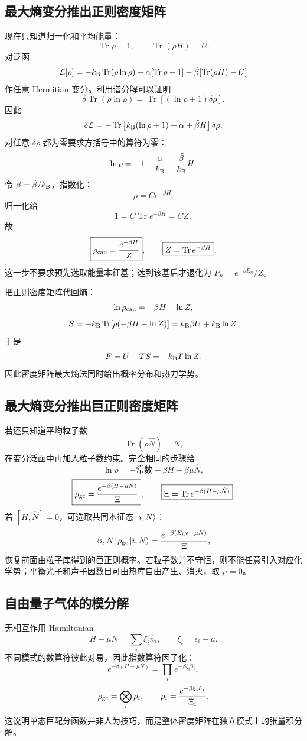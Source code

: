 \subsection{最大熵变分推出正则密度矩阵}
现在只知道归一化和平均能量：
\[
\operatorname{Tr}\rho=1,\qquad
\operatorname{Tr}(\rho H)=U.
\]
对泛函
\[
\mathcal L[\rho]
=-k_{\mathrm B}\operatorname{Tr}(\rho\ln\rho)
-\alpha[\operatorname{Tr}\rho-1]
-\tilde\beta[\operatorname{Tr}(\rho H)-U]
\]
作任意 Hermitian 变分。利用谱分解可以证明
\[
\delta\operatorname{Tr}(\rho\ln\rho)
=\operatorname{Tr}[(\ln\rho+1)\delta\rho].
\]
因此
\[
\delta\mathcal L
=-\operatorname{Tr}\left[
k_{\mathrm B}(\ln\rho+1)+\alpha+\tilde\beta H
\right]\delta\rho.
\]
对任意 $\delta\rho$ 都为零要求方括号中的算符为零：
\[
\ln\rho=-1-\frac{\alpha}{k_{\mathrm B}}
-\frac{\tilde\beta}{k_{\mathrm B}}H.
\]
令 $\beta=\tilde\beta/k_{\mathrm B}$，指数化：
\[
\rho=C e^{-\beta H}.
\]
归一化给
\[
1=C\operatorname{Tr}e^{-\beta H}=CZ,
\]
故
\[
\boxed{
\rho_{\rm can}=\frac{e^{-\beta H}}Z},
\qquad
\boxed{Z=\operatorname{Tr}e^{-\beta H}}.
\]
这一步不要求预先选取能量本征基；选到该基后才退化为
$P_n=e^{-\beta E_n}/Z$。

把正则密度矩阵代回熵：
\[
\ln\rho_{\rm can}=-\beta H-\ln Z,
\]
\[
S=-k_{\mathrm B}\operatorname{Tr}[\rho(-\beta H-\ln Z)]
=k_{\mathrm B}\beta U+k_{\mathrm B}\ln Z.
\]
于是
\[
F=U-TS=-k_{\mathrm B} T\ln Z.
\]
因此密度矩阵最大熵法同时给出概率分布和热力学势。

\subsection{最大熵变分推出巨正则密度矩阵}
若还只知道平均粒子数
\[
\operatorname{Tr}(\rho\hat N)=\bar N,
\]
在变分泛函中再加入粒子数约束。完全相同的步骤给
\[
\ln\rho=-\text{常数}-\beta H+\beta\mu\hat N,
\]
\[
\boxed{
\rho_{\rm gc}
=\frac{e^{-\beta(H-\mu\hat N)}}{\Xi}},
\qquad
\boxed{
\Xi=\operatorname{Tr}e^{-\beta(H-\mu\hat N)}}.
\]
若 $[H,\hat N]=0$，可选取共同本征态 $\left|i,N\right\rangle$：
\[
\left\langle i,N\right|\rho_{\rm gc}\left|i,N\right\rangle
=\frac{e^{-\beta(E_{iN}-\mu N)}}{\Xi},
\]
恢复前面由粒子库得到的巨正则概率。若粒子数并不守恒，则不能任意引入对应化学势；平衡光子和声子因数目可由热库自由产生、消灭，取 $\mu=0$。

\subsection{自由量子气体的模分解}
无相互作用 Hamiltonian
\[
H-\mu N=\sum_i\xi_i\hat n_i,\qquad
\xi_i=\epsilon_i-\mu.
\]
不同模式的数算符彼此对易，因此指数算符因子化：
\[
e^{-\beta(H-\mu N)}
=\prod_i e^{-\beta\xi_i\hat n_i},
\]
\[
\rho_{\rm gc}=\bigotimes_i\rho_i,\qquad
\rho_i=\frac{e^{-\beta\xi_i\hat n_i}}{\Xi_i}.
\]
这说明单态巨配分函数并非人为技巧，而是整体密度矩阵在独立模式上的张量积分解。

